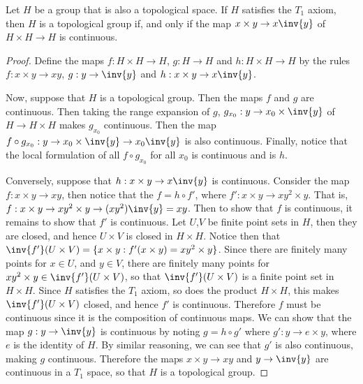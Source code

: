 \begin{lemma}\label{2.5.3}
    Let $H$ be a group that is also a topological space. If $H$ satisfies the
    $T_1$ axiom, then $H$ is a topological group if, and only if the map $x
    \times y \rightarrow x\inv{y}$ of $H \times H \rightarrow H$ is continuous.
\end{lemma}
\begin{proof}
    Define the maps $f:H \times H \rightarrow H$, $g:H \rightarrow H$
    and $h:H \times H \rightarrow H$ by the rules $f:x \times y \rightarrow xy$,
    $g:y \rightarrow \inv{y}$ and $h:x \times y \rightarrow x\inv{y}$.

    Now, suppose that $H$ is a topological group. Then the maps  $f$ and  $g$
    are continuous. Then taking the range expansion of  $g$,  $g_{x_0}:y
    \rightarrow x_0 \times \inv{y}$ of $H \rightarrow H \times H$ makes
    $g_{x_0}$ continuous. Then the map $f \circ g_{x_0}:y \rightarrow x_0 \times
    \inv{y} \rightarrow x_0\inv{y}$ is also continuous. Finally, notice that the
    local formulation of all $f \circ g_{x_0}$ for all $x_0$ is continuous and
    is  $h$.

    Conversely, suppose that  $h:x \times y \rightarrow x\inv{y}$ is continuous.
    Consider the map $f:x \times y \rightarrow xy$, then notice that the
    $f=h \circ f'$, where  $f': x \times y \rightarrow xy^2 \times y$. That is,
    $f: x \times y \rightarrow xy^2  \times y \rightarrow (xy^2)\inv{y}=xy$.
    Then to show that $f$ is continuous, it remains to show that $f'$ is
    continuous. Let $U$,$V$ be finite point sets in $H$, then they are closed,
    and hence  $U \times V$ is closed in  $H \times H$. Notice then that
    $\inv{f'}(U \times V)=\{x \times y : f'(x \times y)=xy^2
    \times y\}$. Since there are finitely many points for $x \in U$, and  $y \in
    V$, there are finitely many points for  $xy^2 \times y  \in \inv{f'}(U
    \times V)$, so that $\inv{f'}(U \times V)$ is a finite point set in  $H
    \times H$.  Since $H$ satisfies the  $T_1$ axiom, so does the product $H
    \times H$, this makes $\inv{f'}(U \times V)$ closed, and hence $f'$ is
    continuous. Therefore $f$ must be continuous since it is the composition of
    continuous maps. We can show that the map  $g:y \rightarrow \inv{y}$ is
    continuous by noting $g=h \circ g'$ where  $g':y \rightarrow e \times y$,
    where $e$ is the identity of  $H$. By similar reasoning, we can see that
    $g'$ is also continuous, making  $g$ continuous. Therefore the maps  $x
    \times y \rightarrow xy$ and $y \rightarrow \inv{y}$ are continuous in a
    $T_1$ space, so that $H$ is a topological group.
\end{proof}

